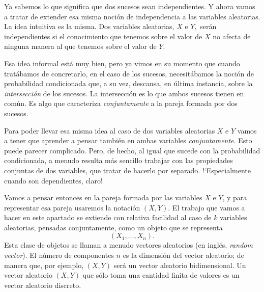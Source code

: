 Ya sabemos lo que significa que dos sucesos sean independientes. Y ahora vamos a tratar de extender esa misma noción de independencia a las variables aleatorias. La idea intuitiva es la misma. Dos variables aleatorias, $X$ e $Y,$ serán independientes si el conocimiento que tenemos sobre el valor de $X$ no afecta de ninguna manera al que tenemos sobre el valor de $Y$.

Esa idea informal está muy bien, pero ya vimos en su momento que cuando tratábamos de concretarlo, en el caso de los sucesos, necesitábamos la noción de probabilidad condicionada que, a su vez, descansa, en última instancia, sobre la {\em intersección} de los sucesos. La intersección es lo que ambos sucesos tienen en común. Es algo que caracteriza {\em conjuntamente} a la pareja formada por dos sucesos.

Para poder llevar esa misma idea al caso de dos variables aleatorias $X$ e $Y$ vamos a tener que aprender a pensar también en ambas variables {\em conjuntamente}. Esto puede parecer complicado. Pero, de hecho, al igual que sucede con la probabilidad condicionada, a menudo resulta más sencillo trabajar con las propiedades conjuntas de dos variables, que tratar de hacerlo por separado.  {!`}Especialmente cuando son dependientes, claro!

Vamos a pensar entonces en la pareja formada por las variables $X$ e $Y$, y para representar esa pareja usaremos la notación $(X,Y)$. El trabajo que vamos a hacer en este apartado se extiende con relativa facilidad al caso de $k$ variables aleatorias, pensadas conjuntamente, como un objeto que se representa
\[(X_1,\ldots,X_n).\]
Esta clase de objetos se llaman a menudo {\sf vectores aleatorios} (en inglés, {\em random vector}). El número de componentes $n$ es la {\sf dimensión} del vector aleatorio; de manera que, por ejemplo, $(X,Y)$ será un vector aleatorio bidimensional. Un vector aleatorio $(X,Y)$ que sólo toma una cantidad finita de valores es un {\sf vector aleatorio discreto}.


